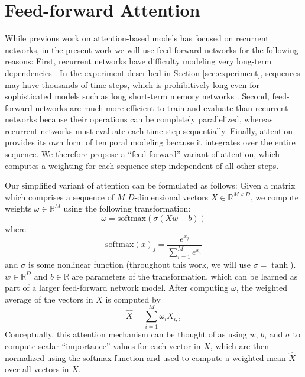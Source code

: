 \documentclass{article}
\begin{document}
\section{Feed-forward Attention}
\label{sec:model}

While previous work on attention-based models has focused on recurrent networks, in the present work we will use feed-forward networks for the following reasons:
First, recurrent networks have difficulty modeling very long-term dependencies \cite{bengio1994learning}.
In the experiment described in Section \ref{sec:experiment}, sequences may have thousands of time steps, which is prohibitively long even for sophisticated models such as long short-term memory networks \cite{hochreiter1997long}.
Second, feed-forward networks are much more efficient to train and evaluate than recurrent networks because their operations can be completely parallelized, whereas recurrent networks must evaluate each time step sequentially.
Finally, attention provides its own form of temporal modeling because it integrates over the entire sequence.
We therefore propose a ``feed-forward'' variant of attention, which computes a weighting for each sequence step independent of all other steps.

Our simplified variant of attention can be formulated as follows:
Given a matrix which comprises a sequence of $M$ $D$-dimensional vectors $X \in \mathbb{R}^{M \times D}$, we compute weights $\omega \in \mathbb{R}^M$ using the following transformation:
\begin{equation}
\label{eq:omega}
\omega = \mathrm{softmax}(\sigma(Xw + b))
\end{equation}
where
$$
\mathrm{softmax}(x)_j = \frac{e^{x_j}}{\sum_{i = 1}^M e^{x_i}}
$$
and $\sigma$ is some nonlinear function (throughout this work, we will use $\sigma = \tanh$).
$w \in \mathbb{R}^D$ and $b \in \mathbb{R}$ are parameters of the transformation, which can be learned as part of a larger feed-forward network model.
After computing $\omega$, the weighted average of the vectors in $X$ is computed by
$$
\hat{X} = \sum_{i = 1}^M \omega_i X_{i, :}
$$
Conceptually, this attention mechanism can be thought of as using $w$, $b$, and $\sigma$ to compute scalar ``importance'' values for each vector in $X$, which are then normalized using the softmax function and used to compute a weighted mean $\hat{X}$ over all vectors in $X$.
\end{document}
